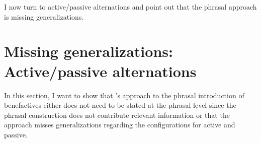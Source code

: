 
I now turn to active/passive alternations and point out that the phrasal approach is missing generalizations.

\chapter{Missing generalizations: Active/passive alternations}
\label{sec-missing-generalization-internal}
\label{sec-active-passive}


In this section, I want to show that \citeauthor*{AGT2014a}'s \citeyearpar{AGT2014a} approach to the phrasal introduction
of benefactives either does not need to be stated at the phrasal level since the phrasal
construction does not contribute relevant information or that the approach misses generalizations
regarding the configurations for active and passive.

